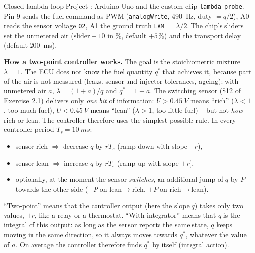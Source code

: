 \begin{exercise}{Closed lambda loop}{\Wokwi}
Project : Arduino Uno and the custom chip
\texttt{lambda-probe}. Pin 9 sends the fuel command as PWM
(\texttt{analogWrite}, \SI{490}{Hz}, duty $=q/2$), A0 reads the sensor voltage
\texttt{O2}, A1 the ground truth \texttt{LAM} $=\lambda/2$. The chip's sliders set
the unmetered air ($\text{slider}-10$ in \%, default $+5\,\%$) and the transport
delay (default \SI{200}{ms}).

\medskip\noindent\textbf{How a two-point controller works.}
The goal is the stoichiometric mixture $\lambda=1$. The ECU does not know the
fuel quantity $q^*$ that achieves it, because part of the air is not
measured (leaks, sensor and injector tolerances, ageing): with unmetered air
$a$, $\lambda=(1+a)/q$ and $q^*=1+a$. The switching sensor
(S12 of Exercise~2.1) delivers only \emph{one bit} of information:
$U>\SI{0.45}{V}$ means ``rich'' ($\lambda<1$, too much fuel), $U<\SI{0.45}{V}$
means ``lean'' ($\lambda>1$, too little fuel) -- but not \emph{how} rich or lean.
The controller therefore uses the simplest possible rule. In every controller
period $T_s=\SI{10}{ms}$:
\begin{itemize}
  \item sensor rich $\Rightarrow$ decrease $q$ by $rT_s$ (ramp down with slope $-r$),
  \item sensor lean $\Rightarrow$ increase $q$ by $rT_s$ (ramp up with slope $+r$),
  \item optionally, at the moment the sensor \emph{switches}, an additional jump
    of $q$ by $P$ towards the other side ($-P$ on lean$\to$rich, $+P$ on
    rich$\to$lean).
\end{itemize}
``Two-point'' means that the controller output (here the slope $\dot q$) takes
only two values, $\pm r$, like a relay or a thermostat. ``With integrator''
means that $q$ is the integral of this output: as long as the sensor reports
the same state, $q$ keeps moving in the same direction, so it always moves
towards $q^*$, whatever the value of $a$. On average the controller therefore
finds $q^*$ by itself (integral action).


\end{exercise}
